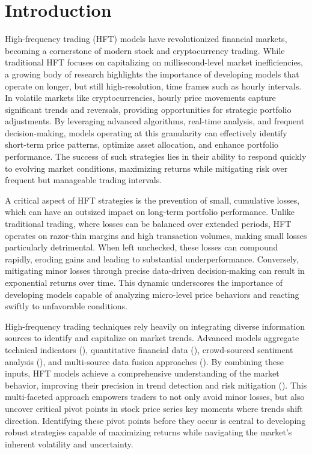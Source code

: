 \section{Introduction}
High-frequency trading (HFT) models have revolutionized financial markets, becoming a cornerstone of modern stock and cryptocurrency trading. While traditional HFT focuses on capitalizing on millisecond-level market inefficiencies, a growing body of research highlights the importance of developing models that operate on longer, but still high-resolution, time frames such as hourly intervals. In volatile markets like cryptocurrencies, hourly price movements capture significant trends and reversals, providing opportunities for strategic portfolio adjustments. By leveraging advanced algorithms, real-time analysis, and frequent decision-making, models operating at this granularity can effectively identify short-term price patterns, optimize asset allocation, and enhance portfolio performance. The success of such strategies lies in their ability to respond quickly to evolving market conditions, maximizing returns while mitigating risk over frequent but manageable trading intervals.

A critical aspect of HFT strategies is the prevention of small, cumulative losses, which can have an outsized impact on long-term portfolio performance. Unlike traditional trading, where losses can be balanced over extended periods, HFT operates on razor-thin margins and high transaction volumes, making small losses particularly detrimental. When left unchecked, these losses can compound rapidly, eroding gains and leading to substantial underperformance. Conversely, mitigating minor losses through precise data-driven decision-making can result in exponential returns over time. This dynamic underscores the importance of developing models capable of analyzing micro-level price behaviors and reacting swiftly to unfavorable conditions.

High-frequency trading techniques rely heavily on integrating diverse information sources to identify and capitalize on market trends. Advanced models aggregate technical indicators (\citet{chen2018profitability}), quantitative financial data (\citet{gomber2015high}), crowd-sourced sentiment analysis (\citet{liu2023multi}), and multi-source data fusion approaches (\citet{asadi4423354multi, liu2023multi}). By combining these inputs, HFT models achieve a comprehensive understanding of the market behavior, improving their precision in trend detection and risk mitigation (\citet{li2014online}). This multi-faceted approach empowers traders to not only avoid minor losses, but also uncover critical pivot points in stock price series key moments where trends shift direction. Identifying these pivot points before they occur is central to developing robust strategies capable of maximizing returns while navigating the market's inherent volatility and uncertainty.

